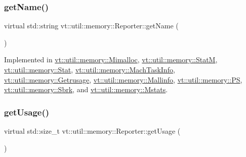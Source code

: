 \subsubsection{\texorpdfstring{get\+Name()}{getName()}}
{\footnotesize\ttfamily virtual std\+::string vt\+::util\+::memory\+::\+Reporter\+::get\+Name (\begin{DoxyParamCaption}{ }\end{DoxyParamCaption})\hspace{0.3cm}{\ttfamily [pure virtual]}}



Implemented in \hyperlink{structvt_1_1util_1_1memory_1_1_mimalloc_a94ad64b69062aeae79fa2d2067cf27f1}{vt\+::util\+::memory\+::\+Mimalloc}, \hyperlink{structvt_1_1util_1_1memory_1_1_stat_m_ad8ea55e89ec3c591348a26b670048814}{vt\+::util\+::memory\+::\+StatM}, \hyperlink{structvt_1_1util_1_1memory_1_1_stat_a2a29912688c89bcb98d6132ecda6070f}{vt\+::util\+::memory\+::\+Stat}, \hyperlink{structvt_1_1util_1_1memory_1_1_mach_task_info_a4800048748574a7d57799c442aa2c390}{vt\+::util\+::memory\+::\+Mach\+Task\+Info}, \hyperlink{structvt_1_1util_1_1memory_1_1_getrusage_ae1261aca38feffabbbc8b8a510556d8b}{vt\+::util\+::memory\+::\+Getrusage}, \hyperlink{structvt_1_1util_1_1memory_1_1_mallinfo_a0e916973e080d93677e2e4f4cbf63580}{vt\+::util\+::memory\+::\+Mallinfo}, \hyperlink{structvt_1_1util_1_1memory_1_1_p_s_a011bb0261eefffa53110ba35243c4c8b}{vt\+::util\+::memory\+::\+PS}, \hyperlink{structvt_1_1util_1_1memory_1_1_sbrk_a21fc8bafbdf0a4bb92184474dae1d0f1}{vt\+::util\+::memory\+::\+Sbrk}, and \hyperlink{structvt_1_1util_1_1memory_1_1_mstats_a4718704523896839b8c7955d1098b647}{vt\+::util\+::memory\+::\+Mstats}.

\mbox{\label{structvt_1_1util_1_1memory_1_1_reporter_a372574f51fdb68077cd3d227ee373de5}} 
\subsubsection{\texorpdfstring{get\+Usage()}{getUsage()}}
{\footnotesize\ttfamily virtual std\+::size\+\_\+t vt\+::util\+::memory\+::\+Reporter\+::get\+Usage (\begin{DoxyParamCaption}{ }\end{DoxyParamCaption})\hspace{0.3cm}{\ttfamily [pure virtual]}}



